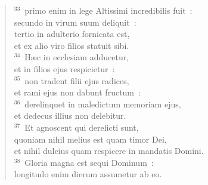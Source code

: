 \begin{flushleft}
\begin{verse}
${}^{33}$~primo enim in lege Altissimi incredibilis fuit~:\\ secundo in virum suum deliquit~:\\ tertio in adulterio fornicata est,\\ et ex alio viro filios statuit sibi.\\
${}^{34}$~H\ae c in ecclesiam adducetur,\\ et in filios ejus respicietur~:\\
${}^{35}$~non tradent filii ejus radices,\\ et rami ejus non dabunt fructum~:\\
${}^{36}$~derelinquet in maledictum memoriam ejus,\\ et dedecus illius non delebitur.\\
${}^{37}$~Et agnoscent qui derelicti sunt,\\ quoniam nihil melius est quam timor Dei,\\ et nihil dulcius quam respicere in mandatis Domini.\\
${}^{38}$~Gloria magna est sequi Dominum~:\\ longitudo enim dierum assumetur ab eo.\end{verse}\end{flushleft}


